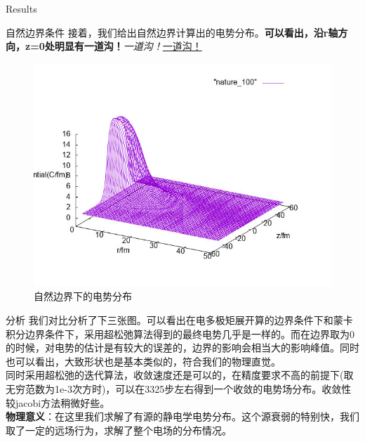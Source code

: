 \documentclass[letterpaper,12pt]{article}
\begin{document}
\begin{section}{Results}
    \begin{subsection}{自然边界条件}
        接着，我们给出自然边界计算出的电势分布。\textbf{可以看出，沿r轴方向，z=0处明显有一道沟！}\emph{一道沟！}\underline{一道沟！}
     \begin{figure}[!htbp]
        \begin{center}
            \includegraphics[scale=.6]{nature_100.jpg}
        \end{center}
        \label{p2}
        \caption{自然边界下的电势分布}
     \end{figure}
     \end{subsection}
     
     \begin{subsection}{分析}
     	我们对比分析了下三张图。可以看出在电多极矩展开算的边界条件下和蒙卡积分边界条件下，采用超松弛算法得到的最终电势几乎是一样的。而在边界取为0的时候，对电势的估计是有较大的误差的，边界的影响会相当大的影响峰值。同时也可以看出，大致形状也是基本类似的，符合我们的物理直觉。\\
     	\indent 同时采用超松弛的迭代算法，收敛速度还是可以的，在精度要求不高的前提下(取无穷范数为1e-3次方时)，可以在3325步左右得到一个收敛的电势场分布。收敛性较jacobi方法稍微好些。\\
     	\indent \textbf{物理意义}：在这里我们求解了有源的静电学电势分布。这个源衰弱的特别快，我们取了一定的远场行为，求解了整个电场的分布情况。

     \end{subsection}
 \end{section}
\end{document}
